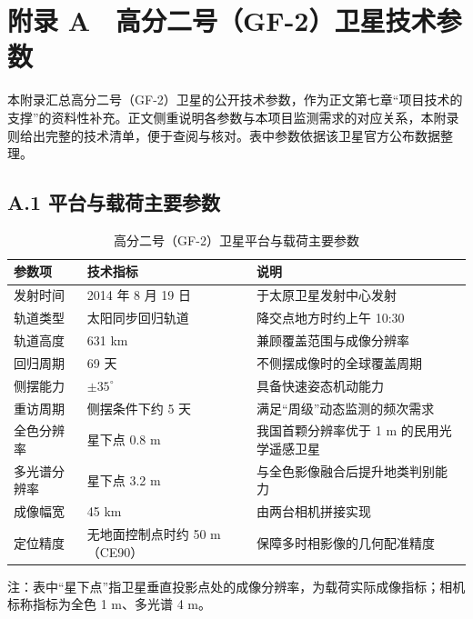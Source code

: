 \documentclass[12pt, a4paper]{ctexart}
\begin{document}
\setcounter{table}{0}
\renewcommand{\thetable}{A-\arabic{table}}

\section{附录 A　高分二号（GF-2）卫星技术参数}

本附录汇总高分二号（GF-2）卫星的公开技术参数，作为正文第七章“项目技术的支撑”的资料性补充。正文侧重说明各参数与本项目监测需求的对应关系，本附录则给出完整的技术清单，便于查阅与核对。表中参数依据该卫星官方公布数据整理。

\subsection{A.1 平台与载荷主要参数}

\begin{table}[htbp]
    \centering
    \caption{高分二号（GF-2）卫星平台与载荷主要参数}
    \label{tab:gf2-platform}
    \small
    \begin{tabular}{|p{3.4cm}|p{5.4cm}|p{4.6cm}|}
        \hline
        \textbf{参数项} & \textbf{技术指标} & \textbf{说明} \\
        \hline
        发射时间 & 2014 年 8 月 19 日 & 于太原卫星发射中心发射 \\
        \hline
        轨道类型 & 太阳同步回归轨道 & 降交点地方时约上午 10:30 \\
        \hline
        轨道高度 & 631 km & 兼顾覆盖范围与成像分辨率 \\
        \hline
        回归周期 & 69 天 & 不侧摆成像时的全球覆盖周期 \\
        \hline
        侧摆能力 & $\pm35^{\circ}$ & 具备快速姿态机动能力 \\
        \hline
        重访周期 & 侧摆条件下约 5 天 & 满足“周级”动态监测的频次需求 \\
        \hline
        全色分辨率 & 星下点 0.8 m & 我国首颗分辨率优于 1 m 的民用光学遥感卫星 \\
        \hline
        多光谱分辨率 & 星下点 3.2 m & 与全色影像融合后提升地类判别能力 \\
        \hline
        成像幅宽 & 45 km & 由两台相机拼接实现 \\
        \hline
        定位精度 & 无地面控制点时约 50 m（CE90） & 保障多时相影像的几何配准精度 \\
        \hline
    \end{tabular}
    \par\vspace{2pt}
    {\footnotesize 注：表中“星下点”指卫星垂直投影点处的成像分辨率，为载荷实际成像指标；相机标称指标为全色 1 m、多光谱 4 m。}
\end{table}
\end{document}
